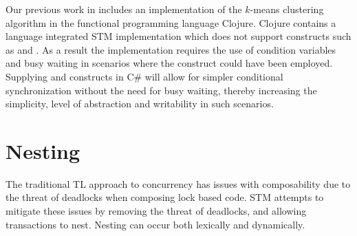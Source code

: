 Our previous work in \cite{dpt907e14trending} includes an implementation of the $k$-means clustering algorithm\cite[p. 451]{dataminingconceptsandtechniques} in the functional programming language Clojure. Clojure contains a language integrated \ac{STM} implementation which does not support constructs such as  and . As a result the implementation requires the use of condition variables and busy waiting in scenarios where the  construct could have been employed\cite{duffy2010stmnet}. Supplying  and  constructs in C\# will allow for simpler conditional synchronization without the need for busy waiting, thereby increasing the simplicity, level of abstraction and writability in such scenarios.

\section{Nesting}
\label{sec:stm_req_nesting}
The traditional \acl{TL} approach to concurrency has issues with composability due to the threat of deadlocks\cite[p. 58]{sutter2005software} when composing lock based code. \ac{STM} attempts to mitigate these issues by removing the threat of deadlocks, and allowing transactions to nest. Nesting can occur both lexically and dynamically\cite[p. 1]{kumar2011hparstm}\cite[p. 42]{harris2010transactional}\cite[p. 2081]{herlihy2011tm}. 

%
%
%       
%
%
%       

